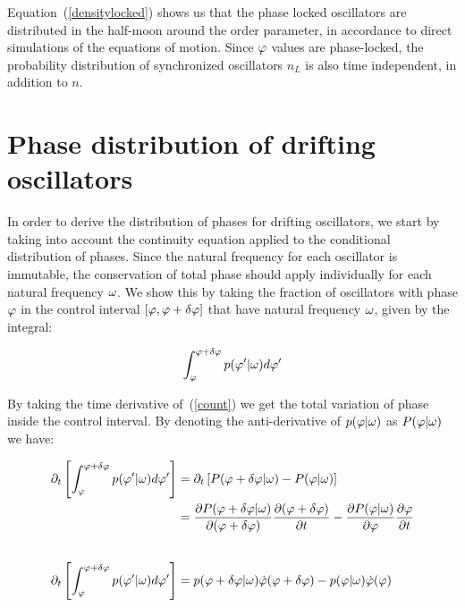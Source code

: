 Equation~(\ref{densitylocked}) shows us that the phase locked oscillators are distributed in the half-moon around the order parameter,
in accordance to direct simulations of the equations of motion. Since $\varphi$ values are phase-locked, the probability distribution
of synchronized oscillators $n_L$ is also time independent, in addition to $n$.

\section{Phase distribution of drifting oscillators}

In order to derive the distribution of phases for drifting oscillators, we start by taking into account the continuity equation applied
to the conditional distribution of phases. Since the natural frequency for each oscillator is immutable, the conservation of total
phase should apply individually for each natural frequency $\omega$. We show this by taking the fraction of oscillators with phase
$\varphi$ in the control interval $[\varphi, \varphi + \delta \varphi ]$ that have natural frequency $\omega$, given by the
integral:

\begin{align}
    \int_{\varphi}^{\varphi + \delta \varphi} p(\varphi' | \omega) d\varphi'
    \label{count}
\end{align}

By taking the time derivative of~(\ref{count}) we get the total variation of phase inside the control interval. By denoting the
anti-derivative of $p(\varphi | \omega)$ as $P(\varphi | \omega)$ we have:

\begin{align}
    \partial_t \left[ \int_{\varphi}^{\varphi + \delta \varphi} p(\varphi' | \omega) d\varphi' \right] &= \partial_t \left[ P(\varphi + \delta\varphi | \omega) - P(\varphi | \omega) \right] \notag\\
    &= \frac{\partial P(\varphi + \delta\varphi | \omega)}{\partial (\varphi+\delta\varphi)}\frac{\partial(\varphi+\delta\varphi)}{\partial t} - \frac{\partial P(\varphi | \omega)}{\partial\varphi}\frac{\partial\varphi}{\partial t} \notag\\[20pt]
    \partial_t \left[ \int_{\varphi}^{\varphi + \delta \varphi} p(\varphi' | \omega) d\varphi' \right] &= p(\varphi+\delta\varphi | \omega)\dot{\varphi}(\varphi+\delta\varphi) - p(\varphi | \omega)\dot{\varphi}(\varphi)
    \label{control_interval}
\end{align}

